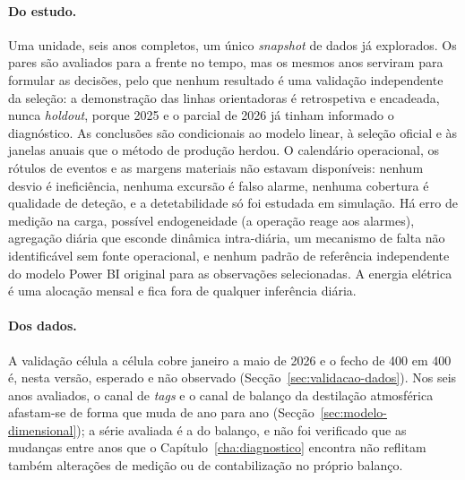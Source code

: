 \paragraph{Do estudo.} Uma unidade, seis anos completos, um único
\emph{snapshot} de dados já explorados. Os pares são avaliados para a frente
no tempo, mas os mesmos anos serviram para formular as decisões, pelo que
nenhum resultado é uma validação independente da seleção: a demonstração das
linhas orientadoras é retrospetiva e encadeada, nunca \emph{holdout}, porque
2025 e o parcial de 2026 já tinham informado o diagnóstico. As conclusões são
condicionais ao modelo linear, à seleção oficial e às janelas anuais que o
método de produção herdou. O calendário operacional, os rótulos de eventos e
as margens materiais não estavam disponíveis: nenhum desvio é ineficiência,
nenhuma excursão é falso alarme, nenhuma cobertura é qualidade de deteção,
e a detetabilidade só foi estudada em simulação. Há erro de medição na
carga, possível endogeneidade (a operação reage aos alarmes), agregação
diária que esconde dinâmica intra-diária, um mecanismo de falta não
identificável sem fonte operacional, e nenhum padrão de referência
independente do modelo Power BI original para as observações selecionadas.
A energia elétrica é uma alocação mensal e fica fora de qualquer inferência
diária.

\paragraph{Dos dados.} A validação célula a célula cobre janeiro a maio de
2026 e o fecho de 400 em 400 é, nesta versão, esperado e não observado
(Secção~\ref{sec:validacao-dados}). Nos seis anos avaliados, o canal de
\emph{tags} e o canal de balanço da destilação atmosférica afastam-se de
forma que muda de ano para ano (Secção~\ref{sec:modelo-dimensional}); a
série avaliada é a do balanço, e não foi verificado que as mudanças entre
anos que o Capítulo~\ref{cha:diagnostico} encontra não reflitam também
alterações de medição ou de contabilização no próprio balanço.

